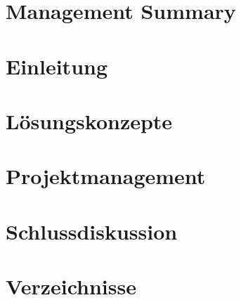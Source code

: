 \documentclass[11pt]{scrartcl}
\begin{document}
        

        \setcounter{tocdepth}{2}
        \tableofcontents
        \clearpage

        \section{Management Summary}
        
        \clearpage
        \section{Einleitung}
        
        \clearpage
        \section{Lösungskonzepte}
        
        \clearpage
        
        \clearpage
        
        \clearpage
        
        \clearpage
        
        \clearpage
        
        \clearpage
        
        \clearpage
        
        \clearpage
        
        \clearpage
        
        \clearpage
        
        \clearpage
        
        \clearpage
        \section{Projektmanagement}
        
        \clearpage
        \section{Schlussdiskussion}
        
        \clearpage
        \section{Verzeichnisse}
        \listoffigures
        \clearpage
        \listoftables
        \clearpage
        
        \clearpage
\end{document}

